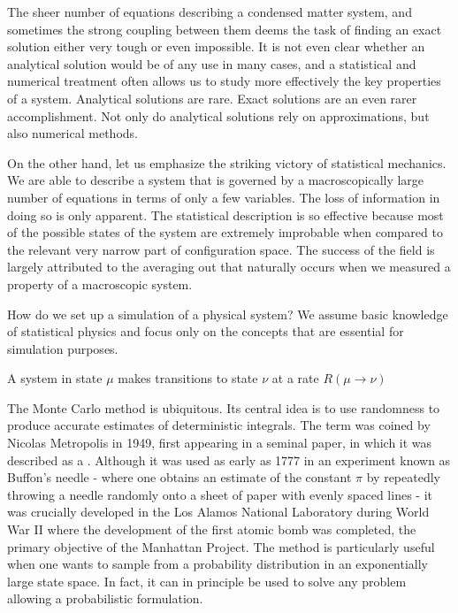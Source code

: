 The sheer number of equations describing a condensed matter system, and sometimes the strong coupling between them deems the task of finding an exact solution either very tough or even impossible. It is not even clear whether an analytical solution would be of any use in many cases, and a statistical and numerical treatment often allows us to study more effectively the key properties of a system. Analytical solutions are rare. Exact solutions are an even rarer accomplishment. Not only do analytical solutions rely on approximations, but also numerical methods.

On the other hand, let us emphasize the striking victory of statistical mechanics. We are able to describe a system that is governed by a macroscopically large number of equations in terms of only a few variables. The loss of information in doing so is only apparent. The statistical description is so effective because most of the possible states of the system are extremely improbable when compared to the relevant very narrow part of configuration space. The success of the field is largely attributed to the averaging out that naturally occurs when we measured a property of a macroscopic system.

How do we set up a simulation of a physical system? We assume basic knowledge of statistical physics and focus only on the concepts that are essential for simulation purposes.

A system in state $\mu$ makes transitions to state $\nu$ at a rate $R(\mu \rightarrow \nu)$


The Monte Carlo method is ubiquitous. Its central idea is to use randomness to produce accurate estimates of deterministic integrals. The term was coined by Nicolas Metropolis in 1949, first appearing in a seminal paper, in which it was described as a \cite{Metropolis1949}. Although it was used as early as 1777 in an experiment known as Buffon's needle - where one obtains an estimate of the constant $\pi$ by repeatedly throwing  a needle randomly onto a sheet of paper with evenly spaced lines - it was crucially developed in the Los Alamos National Laboratory during World War II where the development of the first atomic bomb was completed, the primary objective of the Manhattan Project. The method is particularly useful when one wants to sample from a probability distribution in an exponentially large state space. In fact, it can in principle be used to solve any problem allowing a probabilistic formulation.

